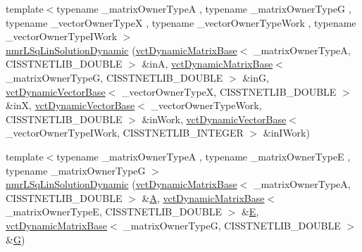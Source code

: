 \begin{DoxyCompactItemize}
\item 
{\footnotesize template$<$typename \+\_\+matrix\+Owner\+Type\+A , typename \+\_\+matrix\+Owner\+Type\+G , typename \+\_\+vector\+Owner\+Type\+X , typename \+\_\+vector\+Owner\+Type\+Work , typename \+\_\+vector\+Owner\+Type\+I\+Work $>$ }\\\hyperlink{classnmr_l_sq_lin_solution_dynamic_ac47585ee9ead0c00d8bb36e458a9a7d9}{nmr\+L\+Sq\+Lin\+Solution\+Dynamic} (\hyperlink{classvct_dynamic_matrix_base}{vct\+Dynamic\+Matrix\+Base}$<$ \+\_\+matrix\+Owner\+Type\+A, C\+I\+S\+S\+T\+N\+E\+T\+L\+I\+B\+\_\+\+D\+O\+U\+B\+L\+E $>$ \&in\+A, \hyperlink{classvct_dynamic_matrix_base}{vct\+Dynamic\+Matrix\+Base}$<$ \+\_\+matrix\+Owner\+Type\+G, C\+I\+S\+S\+T\+N\+E\+T\+L\+I\+B\+\_\+\+D\+O\+U\+B\+L\+E $>$ \&in\+G, \hyperlink{classvct_dynamic_vector_base}{vct\+Dynamic\+Vector\+Base}$<$ \+\_\+vector\+Owner\+Type\+X, C\+I\+S\+S\+T\+N\+E\+T\+L\+I\+B\+\_\+\+D\+O\+U\+B\+L\+E $>$ \&in\+X, \hyperlink{classvct_dynamic_vector_base}{vct\+Dynamic\+Vector\+Base}$<$ \+\_\+vector\+Owner\+Type\+Work, C\+I\+S\+S\+T\+N\+E\+T\+L\+I\+B\+\_\+\+D\+O\+U\+B\+L\+E $>$ \&in\+Work, \hyperlink{classvct_dynamic_vector_base}{vct\+Dynamic\+Vector\+Base}$<$ \+\_\+vector\+Owner\+Type\+I\+Work, C\+I\+S\+S\+T\+N\+E\+T\+L\+I\+B\+\_\+\+I\+N\+T\+E\+G\+E\+R $>$ \&in\+I\+Work)
\item 
{\footnotesize template$<$typename \+\_\+matrix\+Owner\+Type\+A , typename \+\_\+matrix\+Owner\+Type\+E , typename \+\_\+matrix\+Owner\+Type\+G $>$ }\\\hyperlink{classnmr_l_sq_lin_solution_dynamic_aff885544cd953fd22a27c7f71b8d6d07}{nmr\+L\+Sq\+Lin\+Solution\+Dynamic} (\hyperlink{classvct_dynamic_matrix_base}{vct\+Dynamic\+Matrix\+Base}$<$ \+\_\+matrix\+Owner\+Type\+A, C\+I\+S\+S\+T\+N\+E\+T\+L\+I\+B\+\_\+\+D\+O\+U\+B\+L\+E $>$ \&\hyperlink{classnmr_l_sq_lin_solution_dynamic_aa4a41abac141e2e55dd5cafb59169dfd}{A}, \hyperlink{classvct_dynamic_matrix_base}{vct\+Dynamic\+Matrix\+Base}$<$ \+\_\+matrix\+Owner\+Type\+E, C\+I\+S\+S\+T\+N\+E\+T\+L\+I\+B\+\_\+\+D\+O\+U\+B\+L\+E $>$ \&\hyperlink{classnmr_l_sq_lin_solution_dynamic_a7c1ac112b07f3edd33d348fe0a40fb71}{E}, \hyperlink{classvct_dynamic_matrix_base}{vct\+Dynamic\+Matrix\+Base}$<$ \+\_\+matrix\+Owner\+Type\+G, C\+I\+S\+S\+T\+N\+E\+T\+L\+I\+B\+\_\+\+D\+O\+U\+B\+L\+E $>$ \&\hyperlink{classnmr_l_sq_lin_solution_dynamic_a399cb314fb848d36f58c14830bad0c28}{G})
\item 

\end{DoxyCompactItemize}
